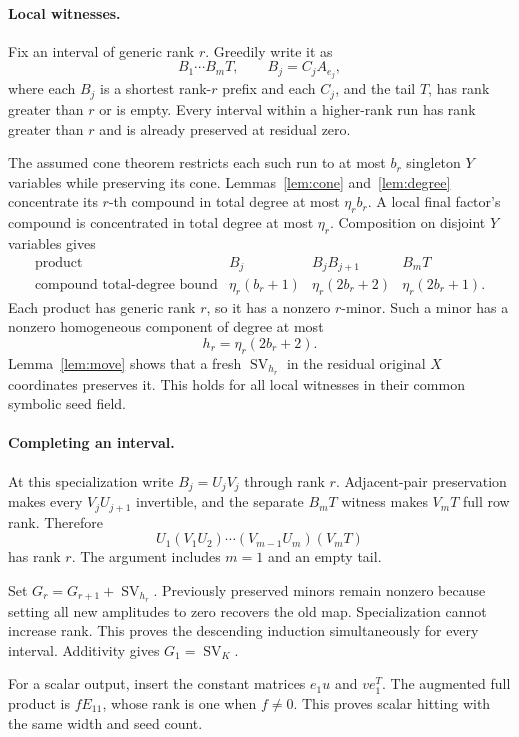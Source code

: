 \documentclass[11pt]{article}
\newcommand{\SV}{\operatorname{SV}}
\begin{document}
\paragraph{Local witnesses.}
Fix an interval of generic rank $r$. Greedily write it as
\[
 B_1\cdots B_mT,\qquad B_j=C_jA_{e_j},
\]
where each $B_j$ is a shortest rank-$r$ prefix and each $C_j$, and the
tail $T$, has rank greater than $r$ or is empty. Every interval within
a higher-rank run has rank greater than $r$ and is already preserved
at residual zero.

The assumed cone theorem restricts each such run to at most $b_r$
singleton $Y$ variables while preserving its cone.
Lemmas~\ref{lem:cone} and~\ref{lem:degree} concentrate its $r$-th
compound in total degree at most $\eta_r b_r$.
A local final factor's compound is concentrated in total degree at most
$\eta_r$. Composition on disjoint $Y$ variables gives
\[
\begin{array}{c|ccc}
 \text{product}&B_j&B_jB_{j+1}&B_mT\\ \hline
 \text{compound total-degree bound}
   &\eta_r(b_r+1)&\eta_r(2b_r+2)&\eta_r(2b_r+1).
\end{array}
\]
Each product has generic rank $r$, so it has a nonzero $r$-minor.
Such a minor has a nonzero homogeneous component of degree at most
\[
 h_r=\eta_r(2b_r+2).
\]
Lemma~\ref{lem:move} shows that a fresh $\SV_{h_r}$ in the residual
original $X$ coordinates preserves it. This holds for all local
witnesses in their common symbolic seed field.

\paragraph{Completing an interval.}
At this specialization write $B_j=U_jV_j$ through rank $r$.
Adjacent-pair preservation makes every $V_jU_{j+1}$ invertible, and
the separate $B_mT$ witness makes $V_mT$ full row rank. Therefore
\[
 U_1(V_1U_2)\cdots(V_{m-1}U_m)(V_mT)
\]
has rank $r$. The argument includes $m=1$ and an empty tail.

Set $G_r=G_{r+1}+\SV_{h_r}$. Previously preserved minors remain
nonzero because setting all new amplitudes to zero recovers the old
map. Specialization cannot increase rank. This proves the descending
induction simultaneously for every interval. Additivity gives
$G_1=\SV_K$.

For a scalar output, insert the constant matrices $e_1u$ and $ve_1^T$.
The augmented full product is $fE_{11}$, whose rank is one when
$f\ne0$. This proves scalar hitting with the same width and seed count.
\end{document}
